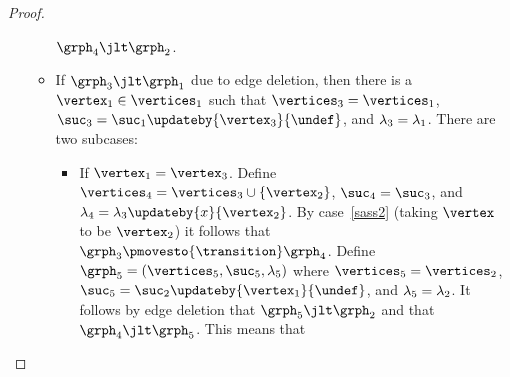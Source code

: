 \begin{proof}
\begin{itemize}
\begin{itemize}
$\grph_4\jlt\grph_2$.
\item
If $\grph_3\jlt\grph_1$ due to edge deletion, then
there is a $\vertex_1\in\vertices_1$ such that
$\vertices_3=\vertices_1$, $\suc_3=\suc_1\updateby{\vertex_3}{\undef}$,
and $\lambda_3=\lambda_1$.
%
%
There are two subcases:
\begin{itemize}
\item
If $\vertex_1=\vertex_3$.
%
Define $\vertices_4=\vertices_3\cup\set{\vertex_2}$,
$\suc_4=\suc_3$, and
$\labeling_4=\labeling_3\updateby{\xvar}{\vertex_2}$.
%
By case~\ref{sass2} (taking $\vertex$ to be $\vertex_2$)
it follows that 
$\grph_3\pmovesto{\transition}\grph_4$.
%
Define $\grph_5=\tuple{\vertices_5,\suc_5,\labeling_5}$ where
$\vertices_5=\vertices_2$, $\suc_5=\suc_2\updateby{\vertex_1}{\undef}$,
and $\lambda_5=\lambda_2$.
%
It follows by edge deletion that $\grph_5\jlt\grph_2$ and that $\grph_4\jlt\grph_5$.
%
This means that 
\end{itemize}

%
\end{itemize}
\end{itemize}

\end{proof}



